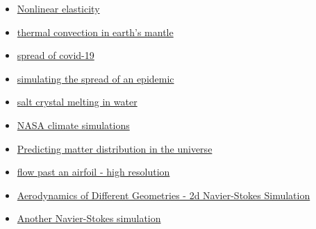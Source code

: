 \documentclass[12pt,a4paper]{article}
\begin{document}
\begin{itemize}
\item \href{https://www.youtube.com/watch?v=u8Kfn2o7epQ}{Nonlinear elasticity}


\item \href{https://www.youtube.com/watch?v=-kDb0HlDsIM}{thermal convection in earth's mantle}


\item \href{https://www.youtube.com/watch?v=dbBmSBA7Kyw}{spread of covid-19}


\item \href{https://www.youtube.com/watch?v=gxAaO2rsdIs}{simulating the spread of an epidemic}


\item \href{https://www.youtube.com/watch?v=_0QhOCDzP4I&t}{salt crystal melting in water}


\item \href{https://www.youtube.com/watch?v=jj0WsQYtT7M}{NASA climate simulations}


\item \href{https://www.youtube.com/watch?v=rtBlZJ6gNiI}{Predicting matter distribution in the universe}


\item \href{https://www.youtube.com/watch?v=hz7UjN_vYuw}{flow past an airfoil - high resolution}


\item \href{https://www.youtube.com/watch?v=bJX8fVsq5oQ}{Aerodynamics of Different Geometries - 2d Navier-Stokes Simulation}


\item \href{https://www.youtube.com/watch?v=vOFcHqImXJ8}{Another Navier-Stokes simulation}

\end{itemize}
\end{document}
